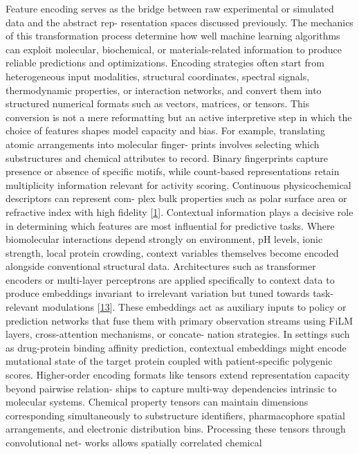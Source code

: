 \documentclass[
]{article}
\begin{document}
Feature encoding serves as the bridge between raw experimental or
simulated data and the abstract rep- resentation spaces discussed
previously. The mechanics of this transformation process determine how
well machine learning algorithms can exploit molecular, biochemical, or
materials-related information to produce reliable predictions and
optimizations. Encoding strategies often start from heterogeneous input
modalities, structural coordinates, spectral signals, thermodynamic
properties, or interaction networks, and convert them into structured
numerical formats such as vectors, matrices, or tensors. This conversion
is not a mere reformatting but an active interpretive step in which the
choice of features shapes model capacity and bias. For example,
translating atomic arrangements into molecular finger- prints involves
selecting which substructures and chemical attributes to record. Binary
fingerprints capture presence or absence of specific motifs, while
count-based representations retain multiplicity information relevant for
activity scoring. Continuous physicochemical descriptors can represent
com- plex bulk properties such as polar surface area or refractive index
with high fidelity {[}\hyperref[_bookmark41]{1}{]}. Contextual
information plays a decisive role in determining which features are most
influential for predictive tasks. Where biomolecular interactions depend
strongly on environment, pH levels, ionic strength, local protein
crowding, context variables themselves become encoded alongside
conventional structural data. Architectures such as transformer encoders
or multi-layer perceptrons are applied specifically to context data to
produce embeddings invariant to irrelevant variation but tuned towards
task-relevant modulations {[}\hyperref[_bookmark53]{13}{]}. These
embeddings act as auxiliary inputs to policy or prediction networks that
fuse them with primary observation streams using FiLM layers,
cross-attention mechanisms, or concate- nation strategies. In settings
such as drug-protein binding affinity prediction, contextual embeddings
might encode mutational state of the target protein coupled with
patient-specific polygenic scores. Higher-order encoding formats like
tensors extend representation capacity beyond pairwise relation- ships
to capture multi-way dependencies intrinsic to molecular systems.
Chemical property tensors can maintain dimensions corresponding
simultaneously to substructure identifiers, pharmacophore spatial
arrangements, and electronic distribution bins. Processing these tensors
through convolutional net- works allows spatially correlated chemical
\end{document}
